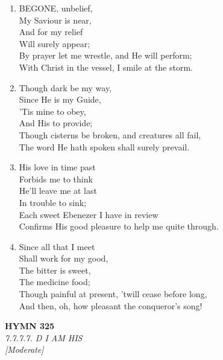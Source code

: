 \documentclass[11pt,a4paper]{article}
\begin{document}
\begin{enumerate}
    \item BEGONE, unbelief, \\
        My Saviour is near, \\
        And for my relief \\
        Will surely appear; \\
        By prayer let me wrestle, and He will perform; \\
        With Christ in the vessel, I smile at the storm.

    \item Though dark be my way, \\
        Since He is my Guide, \\
        'Tis mine to obey, \\
        And His to provide; \\
        Though cisterns be broken, and creatures all fail, \\
        The word He hath spoken shall surely prevail.

    \item His love in time past \\
        Forbids me to think \\
        He'll leave me at last \\
        In trouble to sink; \\
        Each sweet Ebenezer I have in review \\
        Confirms His good pleasure to help me quite through.

    \item Since all that I meet \\
        Shall work for my good, \\
        The bitter is sweet, \\
        The medicine food; \\
        Though painful at present, 'twill cease before long, \\
        And then, oh, how pleasant the conqueror's song!

\end{enumerate}

\newpage
\begin{center}
    {\Large \textbf{HYMN 325}}
    \\
    \textit{7.7.7.7. D I AM HIS}
    \\
    \textit{\small [Moderate]}
\end{center}
\vspace{1em}
\end{document}
